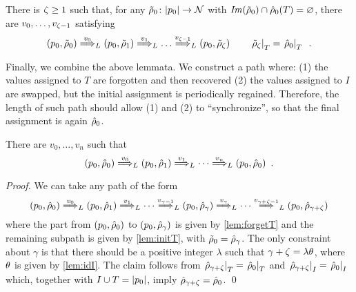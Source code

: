 \begin{lemma}
There is $\zeta \geq 1$ such that,
for any $\tilde{\rho}_0 \colon |p_0| \to \mathcal{N}$ with $\mathit{Im}(\tilde{\rho}_0) \cap \hat{\rho}_0(T) = \varnothing$, there are $v_0,\dots,v_{\zeta-1}$ satisfying
\[
	(p_0,\tilde{\rho}_0) \overset{v_0}{\Longrightarrow}_{L} (p_0,\tilde{\rho}_1) \overset{v_1}{\Longrightarrow}_{L} \dots \overset{v_{\zeta-1}}{\Longrightarrow}_{L} (p_0,\tilde{\rho}_\zeta)	
	\qquad
	\left.\tilde{\rho}_\zeta\right|_{T} = \left.\hat{\rho}_0\right|_{T} \enspace .
\]
\label{lem:initT}
\end{lemma}
%
\vspace{-4ex}
%
Finally, we combine the above lemmata. We construct a path where: (1) the values assigned to $T$ are forgotten and then recovered (2) the values assigned to $I$ are swapped, but the initial assignment is periodically regained. Therefore, the length of such path should allow (1) and (2) to ``synchronize'', so that the final assignment is again $\hat{\rho}_0$.

\begin{theorem}
\label{thm:loop}


There are $v_0,\dots,v_n$ such that
\[
	(p_0, \hat{\rho}_0) \overset{v_0}{\Longrightarrow}_{L} (p_0, \hat{\rho}_1) \overset{v_1}{\Longrightarrow}_{L} \cdots \overset{v_n}{\Longrightarrow}_{L} (p_0,\hat{\rho}_0) \enspace .
\]
\end{theorem}

\begin{proof}
We can take any path of the form
\[
	(p_0,\hat{\rho}_0) \overset{v_0}{\Longrightarrow}_{L} (p_0,\hat{\rho}_1) \overset{v_1}{\Longrightarrow}_{L} \cdots \overset{v_{\gamma-1}}{\Longrightarrow}_{L} (p_0,\hat{\rho}_\gamma) \overset{v_{\gamma}}{\Longrightarrow}_{L} \cdots \overset{v_{\gamma + \zeta - 1}}{\Longrightarrow}_{L} (p_0,\hat{\rho}_{\gamma + 
	 \zeta})
\]
where the part from $(p_0,\hat{\rho}_0)$ to $(p_0,\hat{\rho}_\gamma)$ is given by \cref{lem:forgetT} and the remaining subpath is given by \cref{lem:initT}, with $\tilde{\rho}_0 = \hat{\rho}_\gamma$. The only constraint about $\gamma$ is that there should be a positive integer $\lambda$ such that $\gamma + \zeta = \lambda \theta$, where $\theta$ is given by \cref{lem:idI}. The claim follows from $\left.\hat{\rho}_{\gamma + \zeta}\right|_{T} = \left.\hat{\rho}_0\right|_{T}$ and 
$\left.\hat{\rho}_{\gamma + \zeta}\right|_{I} = \left.\hat{\rho}_0\right|_{I}$ which, together with $I \cup T = |p_0|$, imply $\hat{\rho}_{\gamma + \zeta} = \hat{\rho}_0$.
\qed
\end{proof}
%

